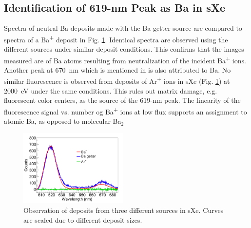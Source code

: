 \documentclass[aps,pra,reprint,superscriptaddress]{revtex4-1}
\begin{document}

\subsection{Identification of 619-nm Peak as Ba in sXe}

Spectra of neutral Ba deposits made with the Ba getter source are compared to spectra of a Ba\textsuperscript{+} deposit in Fig. \ref{fig:ion_getter_ar}.  Identical spectra are observed using the different sources under similar deposit conditions.  This confirms that the images measured are of Ba atoms resulting from neutralization of the incident Ba\textsuperscript{+} ions.  Another peak at 670~nm which is mentioned in \cite{Mong2015} is also attributed to Ba.  No similar fluorescence is observed from deposits of Ar\textsuperscript{+} ions in sXe (Fig. \ref{fig:ion_getter_ar}) at 2000~eV under the same conditions.  This rules out matrix damage, e.g. fluorescent color centers, as the source of the 619-nm peak.  The linearity of the fluorescence signal vs. number og Ba\textsuperscript{+} ions at low flux supports an assignment to atomic Ba, as opposed to molecular Ba$_{2}$

\begin{figure}
\includegraphics[width=0.48\textwidth]{figures/getter_fromthesis_Ar_vs_Ba.png}
\caption{Observation of deposits from three different sources in sXe.  Curves are scaled due to different deposit sizes.}
\label{fig:ion_getter_ar}
\end{figure}

\end{document}
